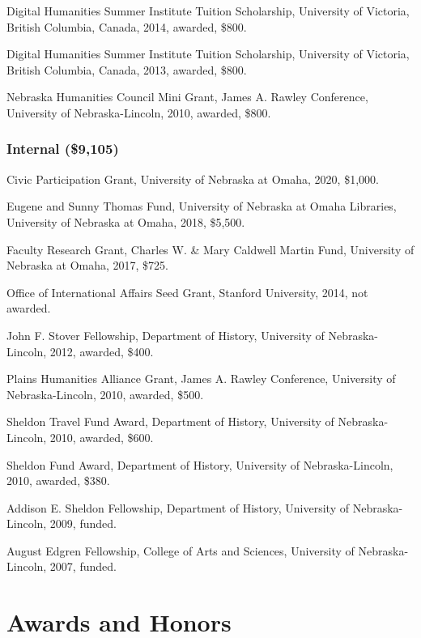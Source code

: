 Digital Humanities Summer Institute Tuition Scholarship, University of
Victoria, British Columbia, Canada, 2014, awarded, \$800.

Digital Humanities Summer Institute Tuition Scholarship, University of
Victoria, British Columbia, Canada, 2013, awarded, \$800.

Nebraska Humanities Council Mini Grant, James A. Rawley Conference,
University of Nebraska-Lincoln, 2010, awarded, \$800.

\hypertarget{internal-9105}{%
\subsubsection{Internal (\$9,105)}\label{internal-9105}}

Civic Participation Grant, University of Nebraska at Omaha, 2020,
\$1,000.

Eugene and Sunny Thomas Fund, University of Nebraska at Omaha Libraries,
University of Nebraska at Omaha, 2018, \$5,500.

Faculty Research Grant, Charles W. \& Mary Caldwell Martin Fund,
University of Nebraska at Omaha, 2017, \$725.

Office of International Affairs Seed Grant, Stanford University, 2014,
not awarded.

John F. Stover Fellowship, Department of History, University of
Nebraska-Lincoln, 2012, awarded, \$400.

Plains Humanities Alliance Grant, James A. Rawley Conference, University
of Nebraska-Lincoln, 2010, awarded, \$500.

Sheldon Travel Fund Award, Department of History, University of
Nebraska-Lincoln, 2010, awarded, \$600.

Sheldon Fund Award, Department of History, University of
Nebraska-Lincoln, 2010, awarded, \$380.

Addison E. Sheldon Fellowship, Department of History, University of
Nebraska-Lincoln, 2009, funded.

August Edgren Fellowship, College of Arts and Sciences, University of
Nebraska-Lincoln, 2007, funded.

\hypertarget{awards-and-honors}{%
\section{Awards and Honors}\label{awards-and-honors}}


